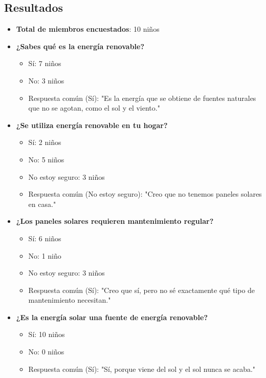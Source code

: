 \documentclass[12pt]{article}
\begin{document}
\subsection{Resultados}
\begin{itemize}
      \item \textbf{Total de miembros encuestados}: 10 niños
      \item \textbf{¿Sabes qué es la energía renovable?}
            \begin{itemize}
                  \item Sí: 7 niños
                  \item No: 3 niños
                  \item Respuesta común (Sí): "Es la energía que se obtiene de fuentes naturales que no se agotan, como el sol y el viento."
            \end{itemize}
      \item \textbf{¿Se utiliza energía renovable en tu hogar?}
            \begin{itemize}
                  \item Sí: 2 niños
                  \item No: 5 niños
                  \item No estoy seguro: 3 niños
                  \item Respuesta común (No estoy seguro): "Creo que no tenemos paneles solares en casa."
            \end{itemize}
      \item \textbf{¿Los paneles solares requieren mantenimiento regular?}
            \begin{itemize}
                  \item Sí: 6 niños
                  \item No: 1 niño
                  \item No estoy seguro: 3 niños
                  \item Respuesta común (Sí): "Creo que sí, pero no sé exactamente qué tipo de mantenimiento necesitan."
            \end{itemize}
      \item \textbf{¿Es la energía solar una fuente de energía renovable?}
            \begin{itemize}
                  \item Sí: 10 niños
                  \item No: 0 niños
                  \item Respuesta común (Sí): "Sí, porque viene del sol y el sol nunca se acaba."

\end{itemize}
\end{itemize}
\end{document}
